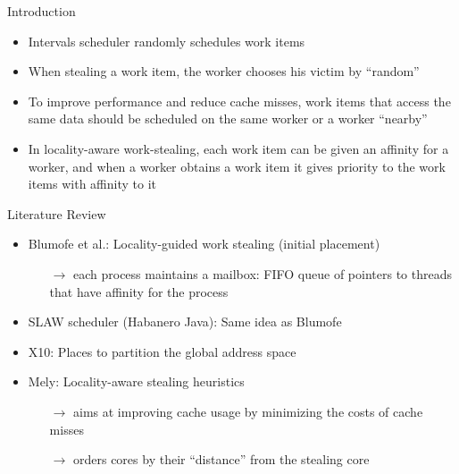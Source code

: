 \begin{frame}{Introduction}
  \begin{itemize}
  \item Intervals scheduler randomly schedules work items
  \item When stealing a work item, the worker chooses his victim by
    ``random''
  \item To improve performance and reduce cache misses, work items
    that access the same data should be scheduled on the same worker
    or a worker ``nearby''
  \item In locality-aware work-stealing, each work item can be given
    an affinity for a worker, and when a worker obtains a work item it
    gives priority to the work items with affinity to it
  \end{itemize}
\end{frame}

\begin{frame}{Literature Review}
  \begin{itemize}
  \item Blumofe et al.: Locality-guided work stealing (initial
    placement)
    \begin{itemize}
    \item[$\rightarrow$] each process maintains a mailbox: FIFO queue
      of pointers to threads that have affinity for the process
    \end{itemize}
  \item SLAW scheduler (Habanero Java): Same idea as Blumofe
  \item X10: Places to partition the global address space
  \item Mely: Locality-aware stealing heuristics
    \begin{itemize}
    \item[$\rightarrow$] aims at improving cache usage by minimizing
      the costs of cache misses
    \item[$\rightarrow$] orders cores by their ``distance'' from the
      stealing core
    \end{itemize}
  \end{itemize}
\end{frame}




